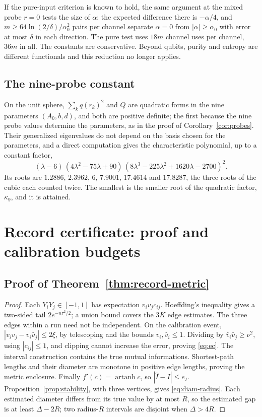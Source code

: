 \documentclass[12pt,a4paper]{article}
\begin{document}
If the pure-input criterion is known to hold, the same argument at the mixed probe $r=0$ tests the size of $\alpha$: the expected difference there is $-\alpha/4$, and $m\ge64\ln(2/\delta)/\alpha_0^2$ pairs per channel separate $\alpha=0$ from $|\alpha|\ge\alpha_0$ with error at most $\delta$ in each direction. The pure test uses $18m$ channel uses per channel, $36m$ in all. The constants are conservative. Beyond qubits, purity and entropy are different functionals and this reduction no longer applies.

\subsection{The nine-probe constant}
\label{sec:probe-constant}

On the unit sphere, $\sum_kq(r_k)^2$ and $Q$ are quadratic forms in the nine parameters $(A_0,b,d)$, and both are positive definite; the first because the nine probe values determine the parameters, as in the proof of Corollary~\ref{cor:probes}. Their generalized eigenvalues do not depend on the basis chosen for the parameters, and a direct computation gives the characteristic polynomial, up to a constant factor,
\[
(\lambda-6)\,(4\lambda^2-75\lambda+90)\,(8\lambda^3-225\lambda^2+1620\lambda-2700)^2 .
\]
Its roots are $1.2886$, $2.3962$, $6$, $7.9001$, $17.4614$ and $17.8287$, the three roots of the cubic each counted twice. The smallest is the smaller root of the quadratic factor, $\kappa_9$, and it is attained. 

\section{Record certificate: proof and calibration budgets}
\label{app:record-proof}
\subsection{Proof of Theorem~\ref{thm:record-metric}}
\begin{proof}
Each $Y_iY_j\in[-1,1]$ has expectation $v_iv_jc_{ij}$.
Hoeffding's inequality gives a two-sided tail
$2e^{-n\tau^2/2}$; a union bound covers the $3K$ edge estimates.
The three edges within a run need not be independent.
On the calibration event,
$|v_iv_j-\widehat v_i\widehat v_j|\le2\xi$, by telescoping and the
bounds $v_i,\widehat v_i\le1$. Dividing by
$\widehat v_i\widehat v_j\ge\nu^2$, using $|c_{ij}|\le1$, and
clipping cannot increase the error, proving \eqref{eq:ec}.
The interval construction contains the true mutual informations.
Shortest-path lengths and their diameter are monotone in positive
edge lengths, proving the metric enclosure. Finally
$f'(c)=\operatorname{artanh}c$, so $|\widehat I-I|\le e_I$.
Proposition~\ref{prop:stability}, with three vertices, gives
\eqref{eq:diam-radius}. Each estimated diameter differs from its true
value by at most $R$, so the estimated gap is at least $\Delta-2R$;
two radius-$R$ intervals are disjoint when $\Delta>4R$.
\end{proof}
\end{document}

